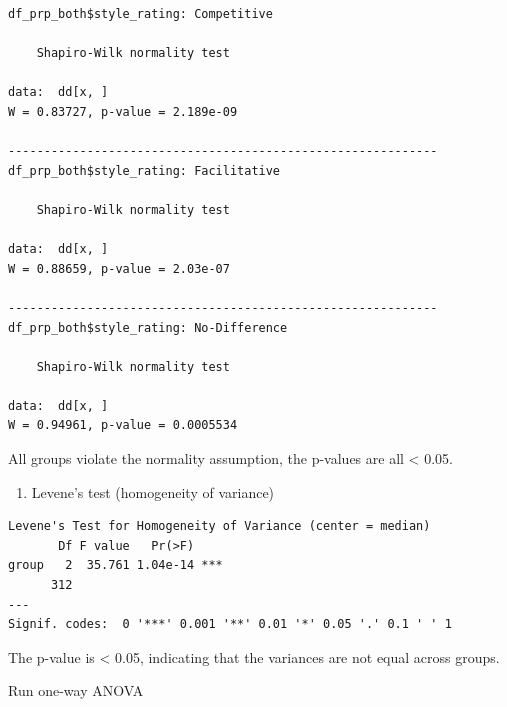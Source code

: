 \documentclass[
  letterpaper,
  DIV=11,
  numbers=noendperiod]{scrartcl}
\newenvironment{Shaded}{\begin{snugshade}}{\end{snugshade}}
\newcommand{\AttributeTok}[1]{\textcolor[rgb]{0.40,0.45,0.13}{#1}}
\newcommand{\FunctionTok}[1]{\textcolor[rgb]{0.28,0.35,0.67}{#1}}
\newcommand{\NormalTok}[1]{\textcolor[rgb]{0.00,0.23,0.31}{#1}}
\newcommand{\OtherTok}[1]{\textcolor[rgb]{0.00,0.23,0.31}{#1}}
\newcommand{\SpecialCharTok}[1]{\textcolor[rgb]{0.37,0.37,0.37}{#1}}
\providecommand{\tightlist}{%
  \setlength{\itemsep}{0pt}\setlength{\parskip}{0pt}}\usepackage{longtable,booktabs,array}
\begin{document}
\begin{verbatim}
df_prp_both$style_rating: Competitive

    Shapiro-Wilk normality test

data:  dd[x, ]
W = 0.83727, p-value = 2.189e-09

------------------------------------------------------------ 
df_prp_both$style_rating: Facilitative

    Shapiro-Wilk normality test

data:  dd[x, ]
W = 0.88659, p-value = 2.03e-07

------------------------------------------------------------ 
df_prp_both$style_rating: No-Difference

    Shapiro-Wilk normality test

data:  dd[x, ]
W = 0.94961, p-value = 0.0005534
\end{verbatim}

All groups violate the normality assumption, the p-values are all
\textless{} 0.05.

\begin{enumerate}
\def\labelenumi{\arabic{enumi}.}
\setcounter{enumi}{1}
\tightlist
\item
  Levene's test (homogeneity of variance)
\end{enumerate}

\begin{Shaded}
\end{Shaded}

\begin{verbatim}
Levene's Test for Homogeneity of Variance (center = median)
       Df F value   Pr(>F)    
group   2  35.761 1.04e-14 ***
      312                     
---
Signif. codes:  0 '***' 0.001 '**' 0.01 '*' 0.05 '.' 0.1 ' ' 1
\end{verbatim}

The p-value is \textless{} 0.05, indicating that the variances are not
equal across groups.

Run one-way ANOVA
\end{document}
